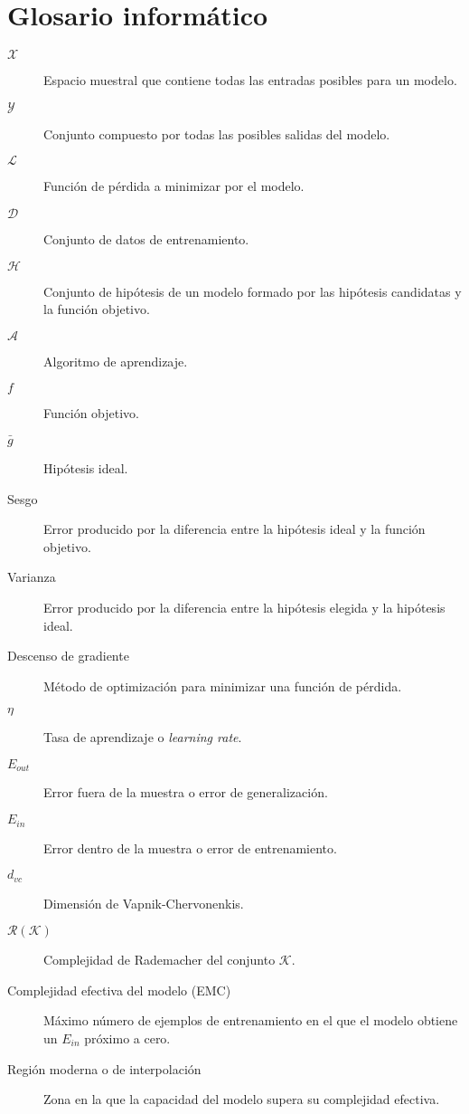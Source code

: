 
\chapter*{Glosario informático}

\begin{description} 
  \item[$\mathcal{X}$] Espacio muestral que contiene todas las entradas posibles para un modelo.
  \item[$\mathcal{Y}$] Conjunto compuesto por todas las posibles salidas del modelo.
  \item[$\mathcal{L}$] Función de pérdida a minimizar por el modelo.
  \item[$\mathcal{D}$] Conjunto de datos de entrenamiento.
  \item[$\mathcal{H}$] Conjunto de hipótesis de un modelo formado por las hipótesis candidatas y la función objetivo.
  \item[$\mathcal{A}$] Algoritmo de aprendizaje. 
  \item[$f$] Función objetivo. 
  \item[$\bar{g}$] Hipótesis ideal.
  \item[Sesgo] Error producido por la diferencia entre la hipótesis ideal y la función objetivo.
  \item[Varianza] Error producido por la diferencia entre la hipótesis elegida y la hipótesis ideal.
  \item[Descenso de gradiente] Método de optimización para minimizar una función de pérdida.
  \item[$\eta$] Tasa de aprendizaje o \textit{learning rate}.
  \item[$E_{out}$] Error fuera de la muestra o error de generalización. 
  \item[$E_{in}$] Error dentro de la muestra o error de entrenamiento.
  \item[$d_{vc}$] Dimensión de Vapnik-Chervonenkis.
  \item[$\mathcal{R}(\mathcal{K})$] Complejidad de Rademacher del conjunto $\mathcal{K}$.
  \item[Complejidad efectiva del modelo (EMC)] Máximo número de ejemplos de entrenamiento en el que el modelo obtiene un $E_{in}$ próximo a cero.
  \item[Región moderna o de interpolación] Zona en la que la capacidad del modelo supera su complejidad efectiva.

\end{description}
